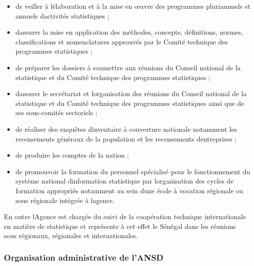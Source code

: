 \documentclass[
  letterpaper,
  DIV=11,
  numbers=noendperiod]{scrartcl}
\begin{document}
\begin{itemize}
\item
  de veiller à l\textquotesingle élaboration et à la mise en œuvre des
  programmes pluriannuels et annuels d\textquotesingle activités
  statistiques ;
\item
  d\textquotesingle assurer la mise en application des méthodes,
  concepts, définitions, normes, classifications et nomenclatures
  approuvés par le Comité technique des programmes statistiques ;
\item
  de préparer les dossiers à soumettre aux réunions du Conseil national
  de la statistique et du Comité technique des programmes statistiques ;
\item
  d\textquotesingle assurer le secrétariat et
  l\textquotesingle organisation des réunions du Conseil national de la
  statistique et du Comité technique des programmes statistiques ainsi
  que de ses sous-comités sectoriels ;
\item
  de réaliser des enquêtes d\textquotesingle inventaire à couverture
  nationale notamment les recensements généraux de la population et les
  recensements d\textquotesingle entreprises ;
\item
  de produire les comptes de la nation ;
\item
  de promouvoir la formation du personnel spécialisé pour le
  fonctionnement du système national d\textquotesingle information
  statistique par l\textquotesingle organisation des cycles de formation
  appropriés notamment au sein d\textquotesingle une école à vocation
  régionale ou sous régionale intégrée à l\textquotesingle agence.
\end{itemize}

En outre l\textquotesingle Agence est chargée du suivi de la coopération
technique internationale en matière de statistique et représente à cet
effet le Sénégal dans les réunions sous régionaux, régionales et
internationales.

\hypertarget{organisation-administrative-de-lansd}{%
\subsubsection{Organisation administrative de
l'ANSD}\label{organisation-administrative-de-lansd}}
\end{document}
